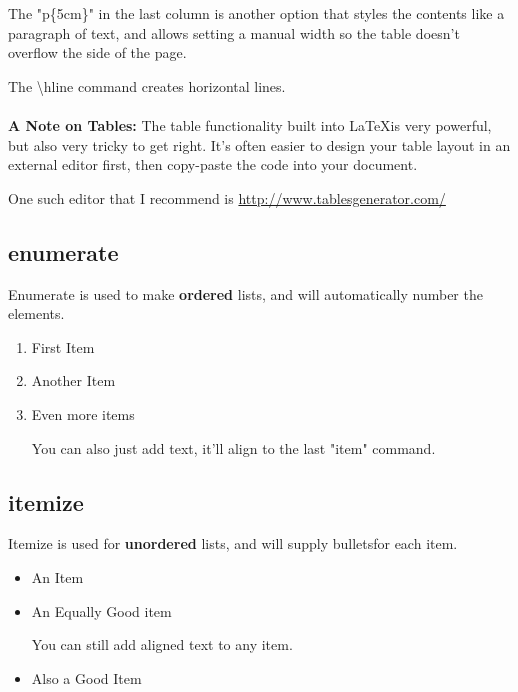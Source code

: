 \documentclass{article}
\begin{document}
        The "p\{5cm\}" in the last column is another option that styles the contents like a paragraph of text, and allows setting a manual width so the table doesn't overflow the side of the page.
        
        The \textbackslash hline command creates horizontal lines. \\\\
        
        \textbf{A Note on Tables:} The table functionality built into \LaTeX is very powerful, but also very tricky to get right. It's often easier to design your table layout in an external editor first, then copy-paste the code into your document.
        
        One such editor that I recommend is \url{http://www.tablesgenerator.com/}

    \subsection{enumerate}
        Enumerate is used to make \textbf{ordered} lists, and will automatically number the elements.
        
        \begin{enumerate}
          \item First Item
          \item Another Item
          \item Even more items
          
          You can also just add text, it'll align to the last "item" command.
        \end{enumerate}
    
    \subsection{itemize}
        Itemize is used for \textbf{unordered} lists, and will supply bulletsfor each item.
        
        \begin{itemize}
          \item An Item
          \item An Equally Good item
          
            You can still add aligned text to any item.
        
          \item Also a Good Item
          
        \end{itemize}
\end{document}
